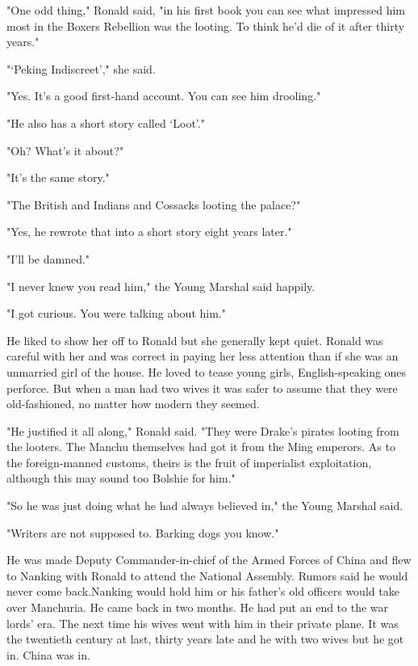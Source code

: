 \par "One odd thing," Ronald said, "in his first book you can see what impressed him most in the Boxers Rebellion was the looting. To think he'd die of it after thirty years."
\par "‘Peking Indiscreet'," she said.
\par "Yes. It's a good first-hand account. You can see him drooling."
\par "He also has a short story called ‘Loot'."
\par "Oh? What's it about?"
\par "It's the same story."
\par "The British and Indians and Cossacks looting the palace?"
\par "Yes, he rewrote that into a short story eight years later."
\par "I'll be damned."
\par "I never knew you read him," the Young Marshal said happily.
\par "I got curious. You were talking about him."
\par He liked to show her off to Ronald but she generally kept quiet. Ronald was careful with her and was correct in paying her less attention than if she was an unmarried girl of the house. He loved to tease young girls, English-speaking ones perforce. But when a man had two wives it was safer to assume that they were old-fashioned, no matter how modern they seemed.
\par "He justified it all along," Ronald said. "They were Drake's pirates looting from the looters. The Manchu themselves had got it from the Ming emperors. As to the foreign-manned customs, theirs is the fruit of imperialist exploitation, although this may sound too Bolshie for him."
\par "So he was just doing what he had always believed in," the Young Marshal said.
\par "Writers are not supposed to. Barking dogs you know."
\par He was made Deputy Commander-in-chief of the Armed Forces of China and flew to Nanking with Ronald to attend the National Assembly. Rumors said he would never come back.Nanking would hold him or his father's old officers would take over Manchuria. He came back in two months. He had put an end to the war lords' era. The next time his wives went with him in their private plane. It was the twentieth century at last, thirty years late and he with two wives but he got in. China was in.













